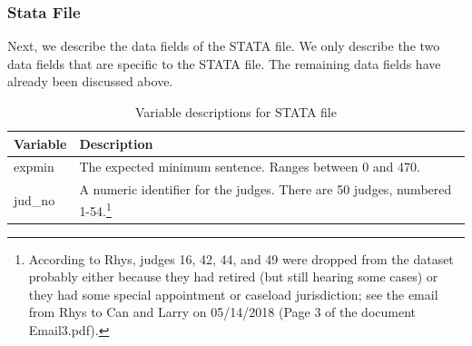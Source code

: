 \documentclass[11pt, oneside]{article}   	%
\theoremstyle{ModifiedStyle}
\begin{document}
    \subsubsection{Stata File}
    	\label{Sec:Data_Description:STATA}
    	Next, we describe the data fields of the STATA file. We only describe the two data fields that are specific to the STATA file. The remaining data fields have already been discussed above.

      \begin{table}[H]
        \centering
        \caption{Variable descriptions for STATA file}
        \label{tab:stata-vars}
        \begin{tabular}{|ll|}
        \hline
        \textbf{Variable} & \textbf{Description}                                                        \\ \hline
        expmin              & The expected minimum sentence. Ranges between 0 and 470.                \\
        jud\_no          & A numeric identifier for the judges. There are 50 judges, numbered 1-54.\footnote{According to Rhys, judges 16, 42, 44, and 49 were dropped from the dataset probably either because they had retired (but still hearing some cases) or they had some special appointment or caseload jurisdiction; see the email from Rhys to Can and Larry on 05/14/2018 (Page 3 of the document Email3.pdf).}\\ \hline
        \end{tabular}
      \end{table}
\end{document}
